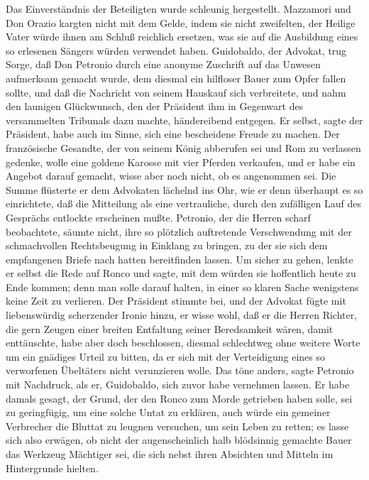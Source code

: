 Das Einverständnis der Beteiligten wurde schleunig hergestellt.
Mazzamori und Don Orazio kargten nicht mit dem \pagenum{[75]}
Gelde, indem sie nicht zweifelten, der Heilige Vater würde ihnen am
Schluß reichlich ersetzen, was sie auf die Ausbildung eines so
erlesenen Sängers würden verwendet haben. Guidobaldo, der Advokat,
trug Sorge, daß Don Petronio durch eine anonyme Zuschrift auf das
Unwesen aufmerksam gemacht wurde, dem diesmal ein hilfloser Bauer
zum Opfer fallen sollte, und daß die Nachricht von seinem Hauskauf
sich verbreitete, und nahm den launigen Glückwunsch, den der
Präsident ihm in Gegenwart des versammelten Tribunals dazu machte,
händereibend entgegen. Er selbst, sagte der Präsident, habe auch im
Sinne, sich eine bescheidene Freude zu machen. Der französische
Gesandte, der von seinem König abberufen sei und Rom zu verlassen
gedenke, wolle eine goldene Karosse mit vier Pferden verkaufen, und
er habe ein Angebot darauf gemacht, wisse aber noch nicht, ob es
angenommen sei. Die Summe flüsterte er dem Advokaten lächelnd ins
Ohr, wie er denn überhaupt es so einrichtete, daß die Mitteilung
als eine vertrauliche, durch den zufälligen Lauf des Gesprächs
entlockte erscheinen mußte. Petronio, der die Herren scharf
beobachtete, säumte nicht, ihre so plötzlich auftretende
Verschwendung mit der schmachvollen Rechtsbeugung in Einklang zu
bringen, zu der sie sich dem empfangenen Briefe nach hatten
bereitfinden lassen. Um sicher zu gehen, lenkte er selbst die Rede
auf Ronco und sagte, mit dem würden sie hoffentlich heute zu Ende
kommen; denn man solle darauf halten, in einer so klaren Sache
wenigstens keine Zeit zu verlieren. Der Präsident stimmte bei, und
der Advokat fügte mit liebenswürdig scherzender Ironie hinzu, er
wisse wohl, daß er die Herren Richter, die gern Zeugen einer
breiten Entfaltung seiner Beredsamkeit wären, damit enttäuschte,
habe aber doch beschlossen, \pagenum{[76]} diesmal schlechtweg ohne
weitere Worte um ein gnädiges Urteil zu bitten, da er sich mit der
Verteidigung eines so verworfenen Übeltäters nicht verunzieren
wolle. Das töne anders, sagte Petronio mit Nachdruck, als er,
Guidobaldo, sich zuvor habe vernehmen lassen. Er habe damals
gesagt, der Grund, der den Ronco zum Morde getrieben haben solle,
sei zu geringfügig, um eine solche Untat zu erklären, auch würde
ein gemeiner Verbrecher die Bluttat zu leugnen versuchen, um sein
Leben zu retten; es lasse sich also erwägen, ob nicht der
augenscheinlich halb blödsinnig gemachte Bauer das Werkzeug
Mächtiger sei, die sich nebst ihren Absichten und Mitteln im
Hintergrunde hielten.


